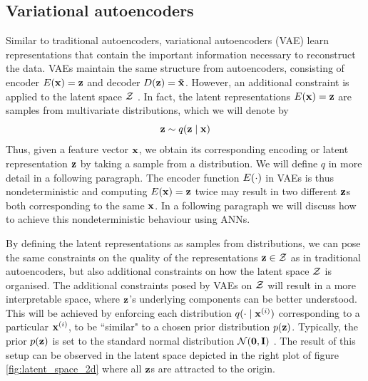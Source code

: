 \subsection{Variational autoencoders}

Similar to traditional autoencoders, variational autoencoders (VAE) learn representations that contain the important information necessary to reconstruct the data. VAEs maintain the same structure from autoencoders, consisting of encoder $E(\mathbf{x}) = \mathbf{z}$ and decoder $D(\mathbf{z}) = \mathbf{\tilde{x}}$. However, an additional constraint is applied to the latent space $\mathcal{Z}$ \cite{doerschTutorialVariationalAutoencoders2021, davidfosterVariationalAutoencoders2023, kingmaAutoEncodingVariationalBayes2022, kingmaIntroductionVariationalAutoencoders2019, cinelliVariationalMethodsMachine2021}. In fact, the latent representations $E(\mathbf{x}) = \mathbf{z}$ are samples from multivariate distributions, which we will denote by 
$$\mathbf{z} \sim q (\mathbf{z} \mid \mathbf{x})$$
Thus, given a feature vector $\mathbf{x}$, we obtain its corresponding encoding or latent representation $\mathbf{z}$ by taking a sample from a distribution. We will define $q$ in more detail in a following paragraph. The encoder function $E(\cdot)$ in VAEs is thus nondeterministic and computing $E(\mathbf{x}) = \mathbf{z}$ twice may result in two different $\mathbf{z}$s both corresponding to the same $\mathbf{x}$. In a following paragraph we will discuss how to achieve this nondeterministic behaviour using ANNs.

By defining the latent representations as samples from distributions, we can pose the same constraints on the quality of the representations $\mathbf{z} \in \mathcal{Z}$ as in traditional autoencoders, but also additional constraints on how the latent space $\mathcal{Z}$ is organised. The additional constraints posed by VAEs on $\mathcal{Z}$ will result in a more interpretable space, where $\mathbf{z}$'s underlying components can be better understood. This will be achieved by enforcing each distribution $q ( \cdot \mid \mathbf{x}^{(i)})$ corresponding to a particular $\mathbf{x}^{(i)}$, to be ``similar" to a chosen prior distribution $p(\mathbf{z})$. Typically, the prior $p(\mathbf{z})$ is set to the standard normal distribution $\mathcal{N}(\bm{\mathbf{0}}, \mathbf{I})$ \cite{davidfosterVariationalAutoencoders2023}. The result of this setup can be observed in the latent space depicted in the right plot of figure \ref{fig:latent_space_2d} where all $\mathbf{z}$s are attracted to the origin.

